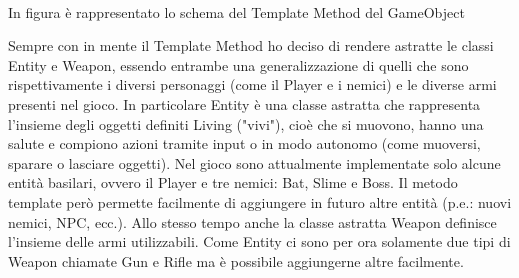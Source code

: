 \documentclass[a4paper,12pt]{report}
\begin{document}
    \\
        \begin{center}
            In figura è rappresentato lo schema del Template Method del GameObject
        \end{center}
    \par Sempre con in mente il Template Method ho deciso di rendere astratte le classi Entity e Weapon, essendo entrambe una generalizzazione di quelli
    che sono rispettivamente i diversi personaggi (come il Player e i nemici) e le diverse armi presenti nel gioco.
    In particolare Entity è una classe astratta che rappresenta l'insieme degli oggetti definiti Living ("vivi"), cioè che si muovono, hanno una salute
    e compiono azioni tramite input o in modo autonomo (come muoversi, sparare o lasciare oggetti).
    Nel gioco sono attualmente implementate solo alcune entità basilari, ovvero il Player e tre nemici: Bat, Slime e Boss. Il metodo template però permette
    facilmente di aggiungere in futuro altre entità (p.e.: nuovi nemici, NPC, ecc.).
    Allo stesso tempo anche la classe astratta Weapon definisce l'insieme delle armi utilizzabili. Come Entity ci sono per ora solamente due tipi di Weapon
    chiamate Gun e Rifle ma è possibile aggiungerne altre facilmente.
    \\
    \par
\end{document}

